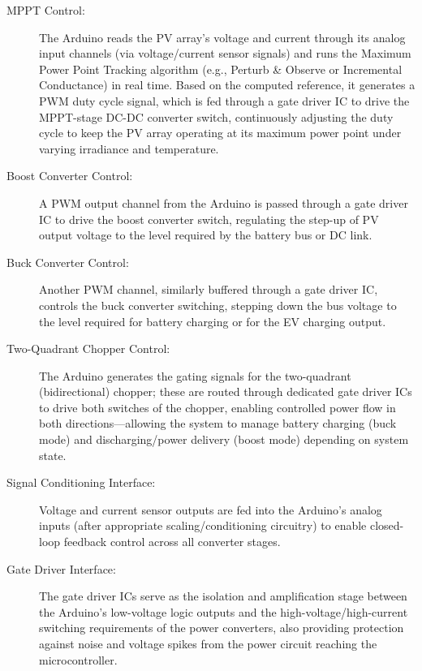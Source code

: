\begin{description}
    \item[MPPT Control:] The Arduino reads the PV array's voltage and current through its analog input channels (via voltage/current sensor signals) and runs the Maximum Power Point Tracking algorithm (e.g., Perturb \& Observe or Incremental Conductance) in real time. Based on the computed reference, it generates a PWM duty cycle signal, which is fed through a gate driver IC to drive the MPPT-stage DC-DC converter switch, continuously adjusting the duty cycle to keep the PV array operating at its maximum power point under varying irradiance and temperature.
    \item[Boost Converter Control:] A PWM output channel from the Arduino is passed through a gate driver IC to drive the boost converter switch, regulating the step-up of PV output voltage to the level required by the battery bus or DC link.
    \item[Buck Converter Control:] Another PWM channel, similarly buffered through a gate driver IC, controls the buck converter switching, stepping down the bus voltage to the level required for battery charging or for the EV charging output.
    \item[Two-Quadrant Chopper Control:] The Arduino generates the gating signals for the two-quadrant (bidirectional) chopper; these are routed through dedicated gate driver ICs to drive both switches of the chopper, enabling controlled power flow in both directions—allowing the system to manage battery charging (buck mode) and discharging/power delivery (boost mode) depending on system state.
    \item[Signal Conditioning Interface:] Voltage and current sensor outputs are fed into the Arduino's analog inputs (after appropriate scaling/conditioning circuitry) to enable closed-loop feedback control across all converter stages.
    \item[Gate Driver Interface:] The gate driver ICs serve as the isolation and amplification stage between the Arduino's low-voltage logic outputs and the high-voltage/high-current switching requirements of the power converters, also providing protection against noise and voltage spikes from the power circuit reaching the microcontroller.
\end{description}

